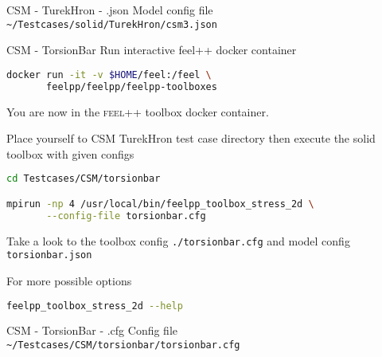 \begin{frame}{CSM - TurekHron - .json}
Model config file \lstinline{~/Testcases/solid/TurekHron/csm3.json}
\vspace{5mm}


\end{frame}





\begin{frame}{CSM - TorsionBar}
Run  interactive feel++ docker container

\begin{lstlisting}[language=Bash,mathescape=false,emph={docker}]
docker run -it -v $HOME/feel:/feel \
       feelpp/feelpp/feelpp-toolboxes 
\end{lstlisting}

You are now in the \textsc{feel++} toolbox docker container.

Place yourself to CSM TurekHron test case directory then execute the
solid toolbox with given configs

\begin{lstlisting}[language=Bash,mathescape=false, emph={feelpp_toolbox_solid_2d}]
cd Testcases/CSM/torsionbar

mpirun -np 4 /usr/local/bin/feelpp_toolbox_stress_2d \
       --config-file torsionbar.cfg
\end{lstlisting}

Take a look to the toolbox config \lstinline{./torsionbar.cfg} and model config
\lstinline{torsionbar.json}

For more possible options
\begin{lstlisting}[language=Bash,mathescape=false, emph={feelpp_toolbox_stress_2d}]
feelpp_toolbox_stress_2d --help
\end{lstlisting}

\end{frame}

\begin{frame}{CSM - TorsionBar - .cfg}
    Config file \lstinline{~/Testcases/CSM/torsionbar/torsionbar.cfg}
\vspace{5mm}
    
\end{frame}

